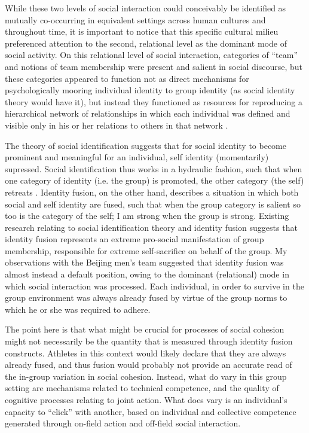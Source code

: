 \begin{CJK}{UTF8}{gbsn}
  While these two levels of social interaction could conceivably be identified as mutually co-occurring in equivalent settings across human cultures and throughout time, it is important to notice that this specific cultural milieu preferenced attention to the second, relational level as the dominant mode of social activity.  On this relational level of social interaction, categories of ``team'' and notions of team membership were present and salient in social discourse, but these categories appeared to function not as direct mechanisms for psychologically mooring individual identity to group identity (as social identity theory would have it), but instead they functioned as resources for reproducing a hierarchical network of relationships in which each individual was defined and visible only in his or her relations to others in that network \cite{Yuki2003}.

  The theory of social identification suggests that for social identity to become prominent and meaningful for an individual, self identity (momentarily) supressed.  Social identification thus works in a hydraulic fashion, such that when one category of identity (i.e. the group) is promoted, the other category (the self) retreats \citep{Swann2009}.  Identity fusion, on the other hand, describes a situation in which both social and self identity are fused, such that when the group category is salient so too is the category of the self; I am strong when the group is strong.  Existing research relating to social identification theory and identity fusion suggests that identity fusion represents an extreme pro-social manifestation of group membership, responsible for extreme self-sacrifice on behalf of the group.  My observations with the Beijing men's team suggested that identity fusion was almost instead a default position, owing to the dominant (relational) mode in which social interaction was processed.  Each individual, in order to survive in the group environment was always already fused by virtue of the group norms to which he or she was required to adhere.

  The point here is that what might be crucial for processes of social cohesion might not necessarily be the quantity that is measured through identity fusion constructs. Athletes in this context would likely declare that they are always already fused, and thus fusion would probably not provide an accurate read of the in-group variation in social cohesion. Instead, what do vary in this group setting are mechanisms related to technical competence, and the quality of cognitive processes relating to joint action.  What does vary is an individual's capacity to ``click'' with another, based on individual and collective competence generated through on-field action and off-field social interaction.


\end{CJK}
